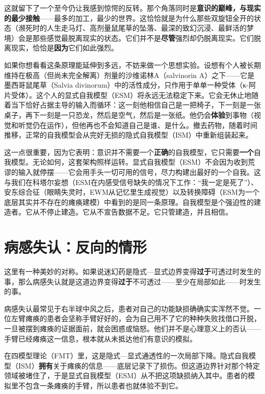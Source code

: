 \documentclass[11pt, twoside, openright]{book}
\begin{document}
这就留下了一个至今仍让我感到惊愕的反转。那个角落同时是\textbf{意识的巅峰，与现实的最少接触}------最多的加工，最少的世界。这恰恰就是为什么那些双旋钮全开的状态（濒死时的人生走马灯、高剂量鼠尾草的坠落、最深的致幻沉浸、最鲜活的梦境）会是那些感觉最脱离现实的状态。它们并不是\textbf{尽管}强烈却仍脱离现实。它们脱离现实，恰恰是\textbf{因为}它们如此强烈。

如果你想看看这条原理能延伸到多远，不妨来做一个思想实验。设想有个人被长期维持在极高（但尚未完全解离）剂量的沙维诺林A（salvinorin A）之下------它是墨西哥鼠尾草（Salvia divinorum）中的活性成分，只作用于单单一种受体（κ-阿片受体）。这个人的显式自我模型（ESM）将永远无法稳定下来。它会无休止地随着当下恰好占据主导的输入而循环：这一刻他相信自己是一把椅子，下一刻是一张桌子，再下一刻是一只恐龙，然后是空气，然后是一张纸。他仍会\textbf{体验}到事物（视觉和听觉仍在运作），但他再也不会知道自己是谁、是什么。撤去药物，随着时间推移，正常的自我模型会从完好无损的隐式自我模型（ISM）中重新组装起来。

这一点很重要，因为它表明：意识并不需要一个\textbf{正确}的自我模型，它只需要\textbf{一个}自我模型。无论如何，这套架构照样运转。显式自我模型（ESM）不会因为收到荒谬的输入就停摆------它会用手头一切可用的信号，尽力构建出最好的一个自我。这与我们在科塔尔妄想（ESM在内感受信号缺失的情况下工作：“我一定是死了”）、安东综合征（眼睛失灵时，EWM从记忆里生成视觉）以及转换障碍（ESM为一个底层其实并不存在的瘫痪建模）中看到的是同一条原理。自我模型是个强迫性的建造者。它从不停止建造。它从不宣告数据不足。它只管建造，并且相信。

\section*{病感失认：反向的情形}

这里有一种美妙的对称。如果说迷幻药是隐式---显式边界变得\textbf{过于}可透过时发生的事，那么病感失认就是这道边界变得\textbf{过于}不可透过------至少在局部如此------时发生的事。

病感失认最常见于右半球中风之后，患者对自己的功能缺损确确实实浑然不觉。一位左臂瘫痪的患者会坚称手臂好好的，会为自己用不了它的种种失败找借口开脱，一旦被摆到瘫痪的证据面前，就会困惑或恼怒。他们并不是心理意义上的否认------手臂已经瘫痪这一信息，根本就从未抵达他们有意识的模拟。

在四模型理论（FMT）里，这是隐式---显式通透性的一次局部下降。隐式自我模型（ISM）\textbf{拥有}关于瘫痪的信息------底层记录下了损伤。但这道边界针对那个特定领域被堵住了，于是显式自我模型（ESM）从不把这项缺损纳入其中。患者的模拟里不包含一条瘫痪的手臂，所以患者也就体验不到它。
\end{document}
